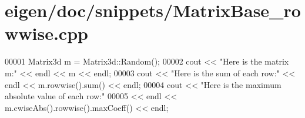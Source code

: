 \hypertarget{eigen_2doc_2snippets_2_matrix_base__rowwise_8cpp_source}{}\section{eigen/doc/snippets/\+Matrix\+Base\+\_\+rowwise.cpp}
\label{eigen_2doc_2snippets_2_matrix_base__rowwise_8cpp_source}

\begin{DoxyCode}
00001 Matrix3d m = Matrix3d::Random();
00002 cout << \textcolor{stringliteral}{"Here is the matrix m:"} << endl << m << endl;
00003 cout << \textcolor{stringliteral}{"Here is the sum of each row:"} << endl << m.rowwise().sum() << endl;
00004 cout << \textcolor{stringliteral}{"Here is the maximum absolute value of each row:"}
00005      << endl << m.cwiseAbs().rowwise().maxCoeff() << endl;
\end{DoxyCode}
